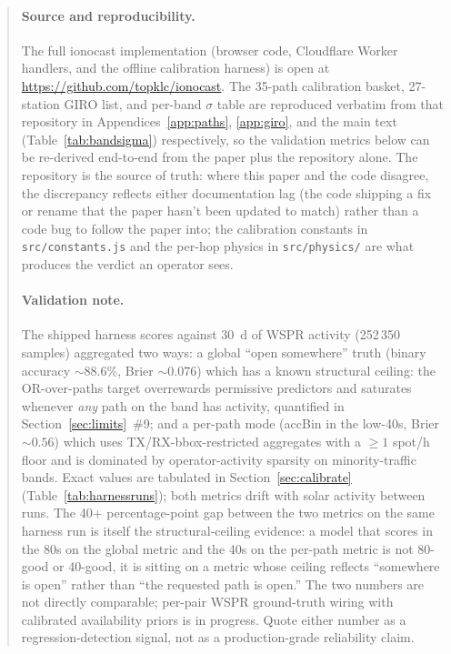 \documentclass[11pt,a4paper]{article}
\begin{document}
\begin{abstract}
\paragraph{Source and reproducibility.} The full ionocast
implementation (browser code, Cloudflare Worker handlers, and
the offline calibration harness) is open at
\url{https://github.com/topklc/ionocast}.  The 35-path
calibration basket, 27-station GIRO list, and per-band $\sigma$
table are reproduced verbatim from that repository in
Appendices~\ref{app:paths}, \ref{app:giro}, and the main text
(Table~\ref{tab:bandsigma}) respectively, so the validation
metrics below can be re-derived end-to-end from the paper plus
the repository alone.  The repository is the source of truth:
where this paper and the code disagree, the discrepancy reflects
either documentation lag (the code shipping a fix or rename
that the paper hasn't been updated to match) rather than a code
bug to follow the paper into; the calibration constants in
\texttt{src/constants.js} and the per-hop physics in
\texttt{src/physics/} are what produces the verdict an operator
sees.

\paragraph{Validation note.} The shipped harness scores against
30~d of WSPR activity (252\,350 samples) aggregated two ways: a
global ``open somewhere'' truth (binary accuracy
${\sim}\!88.6\%$, Brier ${\sim}\!0.076$)
which has a known structural ceiling: the OR-over-paths
target overrewards permissive predictors and saturates
whenever \emph{any} path on the band has activity, quantified
in Section~\ref{sec:limits}~\#9; and a per-path mode (accBin
in the low-40s, Brier ${\sim}\!0.56$) which uses
TX/RX-bbox-restricted aggregates with a $\geq 1$ spot/h floor
and is dominated by operator-activity sparsity on
minority-traffic bands.  Exact values are tabulated in
Section~\ref{sec:calibrate} (Table~\ref{tab:harnessruns});
both metrics drift with solar activity between runs.  The 40+
percentage-point gap between the two
metrics on the same harness run is itself the structural-ceiling
evidence: a model that scores in the 80s on the global metric
and the 40s on the per-path metric is not 80-good or 40-good,
it is sitting on a metric whose ceiling reflects ``somewhere is
open'' rather than ``the requested path is open.''  The two
numbers are not directly comparable; per-pair WSPR ground-truth
wiring with calibrated availability priors is in progress.
Quote either number as a regression-detection signal, not as a
production-grade reliability claim.
\end{abstract}
\end{document}

